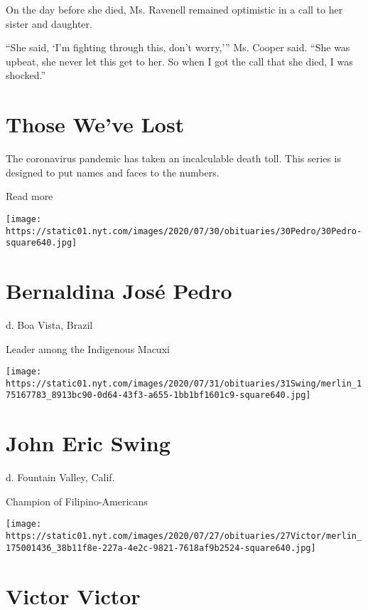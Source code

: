 On the day before she died, Ms. Ravenell remained optimistic in a call
to her sister and daughter.

``She said, `I'm fighting through this, don't worry,''' Ms. Cooper said.
``She was upbeat, she never let this get to her. So when I got the call
that she died, I was shocked.''

\href{https://www.nytimes.com/interactive/2020/obituaries/people-died-coronavirus-obituaries.html?action=click\&pgtype=Article\&state=default\&region=BELOW_MAIN_CONTENT\&context=covid_obits_promo}{}

\hypertarget{those-weve-lost}{%
\section{Those We've Lost}\label{those-weve-lost}}

The coronavirus pandemic has taken an incalculable death toll. This
series is designed to put names and faces to the numbers.

Read more

\texttt{[image: https://static01.nyt.com/images/2020/07/30/obituaries/30Pedro/30Pedro-square640.jpg]}

\hypertarget{bernaldina-josuxe9-pedro}{%
\section{Bernaldina José Pedro}\label{bernaldina-josuxe9-pedro}}

d. Boa Vista, Brazil

Leader among the Indigenous Macuxi

\texttt{[image: https://static01.nyt.com/images/2020/07/31/obituaries/31Swing/merlin\_175167783\_8913bc90-0d64-43f3-a655-1bb1bf1601c9-square640.jpg]}

\hypertarget{john-eric-swing}{%
\section{John Eric Swing}\label{john-eric-swing}}

d. Fountain Valley, Calif.

Champion of Filipino-Americans

\texttt{[image: https://static01.nyt.com/images/2020/07/27/obituaries/27Victor/merlin\_175001436\_38b11f8e-227a-4e2c-9821-7618af9b2524-square640.jpg]}

\hypertarget{victor-victor}{%
\section{Victor Victor}\label{victor-victor}}

